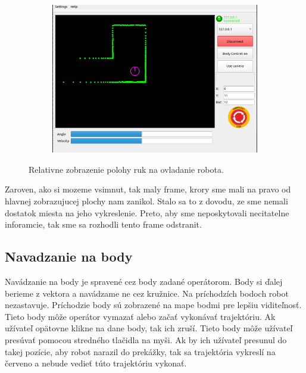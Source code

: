 \begin{figure}[!htbp]
	\vspace{\baselineskip}

	\begin{subfigure}{0.49\textwidth}
		\includegraphics[width=\textwidth]{img/body-control.png}
	\end{subfigure}

	\caption{ Relativne zobrazenie polohy ruk na ovladanie robota. }
	\label{fig:progres-bars}
\end{figure}

Zaroven, ako si mozeme vsimnut, tak maly frame, krory sme mali na pravo od hlavnej zobrazujucej plochy nam zanikol.
Stalo sa to z dovodu, ze sme nemali dostatok miesta na jeho vykreslenie. Preto, aby sme neposkytovali necitatelne
inforamcie, tak sme sa rozhodli tento frame odstranit.

\newpage

\subsection{Navadzanie na body}

Navádzanie na body je spravené cez body zadané operátorom. Body si ďalej berieme
z vektora a navádzame ne cez kružnice. Na príchodzích bodoch robot nezastavuje.
Príchodzie body sú zobrazené na mape bodmi pre lepšiu viditeľnosť. Tieto body môže operátor vymazať alebo začať
vykonávať trajektóriu. Ak užívateľ opätovne klikne na dane body, tak ich zruší. Tieto body môže užívateľ presúvať
pomocou stredného tlačidla na myši. Ak by ich užívateľ presunul do takej pozície, aby robot narazil do prekážky, tak sa
trajektória vykreslí na červeno a nebude vedieť túto trajektóriu vykonať.


